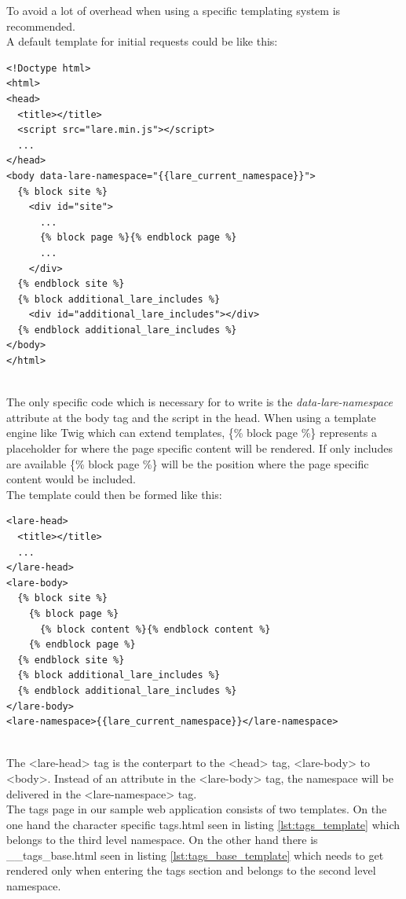 To avoid a lot of overhead when using \lare{} a specific templating system is recommended.
\\
A default template for initial requests could be like this:

\begin{minipage}[c]{0.95\linewidth}
\begin{lstlisting}[caption=\_\_base.html, label=lst:example_lare_base_template]
<!Doctype html>
<html>
<head>
  <title></title>
  <script src="lare.min.js"></script>
  ...
</head>
<body data-lare-namespace="{{lare_current_namespace}}">
  {% block site %}
    <div id="site">
      ...
      {% block page %}{% endblock page %}
      ...
    </div>
  {% endblock site %}
  {% block additional_lare_includes %}
    <div id="additional_lare_includes"></div>
  {% endblock additional_lare_includes %}
</body>
</html>
\end{lstlisting}
\end{minipage}
\\
The only specific code which is necessary for \lare{} to write is the \emph{data-lare-namespace} attribute at the body tag and the script in the head.
When using a template engine like Twig which can extend templates, \{\% block page \%\} represents a placeholder for where the page specific content will be rendered.
If only includes are available \{\% block page \%\} will be the position where the page specific content would be included.
\\
The \lare{} template could then be formed like this:

\begin{minipage}[c]{0.95\linewidth}
\begin{lstlisting}[caption=\_\_lare.html, label=lst:example_lare_template]
<lare-head>
  <title></title>
  ...
</lare-head>
<lare-body>
  {% block site %}
    {% block page %}
      {% block content %}{% endblock content %}
    {% endblock page %}
  {% endblock site %}
  {% block additional_lare_includes %}
  {% endblock additional_lare_includes %}
</lare-body>
<lare-namespace>{{lare_current_namespace}}</lare-namespace>
\end{lstlisting}
\end{minipage}
\\
The <lare-head> tag is the conterpart to the <head> tag, <lare-body> to <body>.
Instead of an attribute in the <lare-body> tag, the namespace will be delivered in the <lare-namespace> tag.
\\
The tags page in our sample web application consists of two templates.
On the one hand the character specific tags.html seen in listing \ref{lst:tags_template} which belongs to the third level namespace.
On the other hand there is \_\_tags\_base.html seen in listing \ref{lst:tags_base_template} which needs to get rendered only when entering the tags section and belongs to the second level namespace.

